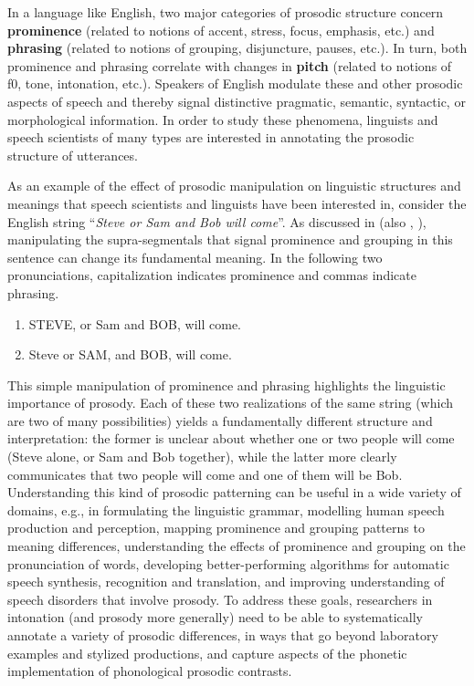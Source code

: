 \documentclass[11pt, twoside]{memoir}
\def\langtext#1{\textit{#1}}
\begin{document}
In a language like English, two major categories of prosodic structure concern \textbf{prominence} (related to notions of accent, stress, focus, emphasis, etc.) and \textbf{phrasing} (related to notions of grouping, disjuncture, pauses, etc.). In turn, both prominence and phrasing correlate with changes in \textbf{pitch} (related to notions of f0, tone, intonation, etc.). Speakers of English modulate these and other prosodic aspects of speech and thereby signal distinctive pragmatic, semantic, syntactic, or morphological information. In order to study these phenomena, linguists and speech scientists of many types are interested in annotating the prosodic structure of utterances.

As an example of the effect of prosodic manipulation on linguistic structures and meanings that speech scientists and linguists have been interested in, consider the English string “\langtext{Steve or Sam and Bob will come}”. As discussed in \citealt{lehiste73} (also \citealt{price-91}, \citealt{veilleux-06}), manipulating the supra-segmentals that signal prominence and grouping in this sentence can change its fundamental meaning. In the following two pronunciations, capitalization indicates prominence and commas indicate phrasing.

\begin{enumerate} \def\labelenumi{\arabic{enumi}.}
\item STEVE, or Sam and BOB, will come.
\item Steve or SAM, and BOB, will come. \end{enumerate}

This simple manipulation of prominence and phrasing highlights the linguistic importance of prosody. Each of these two realizations of the same string (which are two of many possibilities) yields a fundamentally different structure and interpretation: the former is unclear about whether one or two people will come (Steve alone, or Sam and Bob together), while the latter more clearly communicates that two people will come and one of them will be Bob. Understanding this kind of prosodic patterning can be useful in a wide variety of domains, e.g., in formulating the linguistic grammar, modelling human speech production and perception, mapping prominence and grouping patterns to meaning differences, understanding the effects of prominence and grouping on the pronunciation of words, developing better-performing algorithms for automatic speech synthesis, recognition and translation, and improving understanding of speech disorders that involve prosody. To address these goals, researchers in intonation (and prosody more generally) need to be able to systematically annotate a variety of prosodic differences, in ways that go beyond laboratory examples and stylized productions, and capture aspects of the phonetic implementation of phonological prosodic contrasts.
\end{document}
